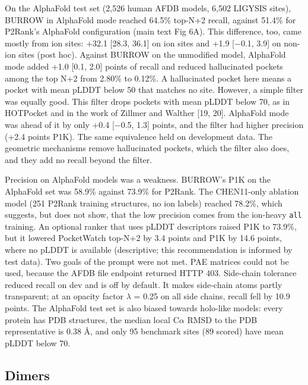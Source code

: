 \documentclass[10pt,letterpaper]{article}
\begin{document}
On the AlphaFold test set (2,526 human AFDB models, 6,502 LIGYSIS sites), BURROW in AlphaFold mode reached 64.5\% top-N+2 recall, against 51.4\% for P2Rank's AlphaFold configuration (main text Fig 6A). This difference, too, came mostly from ion sites: +32.1 [28.3, 36.1] on ion sites and +1.9 [$-$0.1, 3.9] on non-ion sites (post hoc). Against BURROW on the unmodified model, AlphaFold mode added +1.0 [0.1, 2.0] points of recall and reduced hallucinated pockets among the top N+2 from 2.80\% to 0.12\%. A hallucinated pocket here means a pocket with mean pLDDT below 50 that matches no site. However, a simple filter was equally good. This filter drops pockets with mean pLDDT below 70, as in HOTPocket and in the work of Zillmer and Walther [19, 20]. AlphaFold mode was ahead of it by only +0.4 [$-$0.5, 1.3] points, and the filter had higher precision (+2.4 points P1K). The same equivalence held on development data. The geometric mechanisms remove hallucinated pockets, which the filter also does, and they add no recall beyond the filter.

Precision on AlphaFold models was a weakness. BURROW's P1K on the AlphaFold set was 58.9\% against 73.9\% for P2Rank. The CHEN11-only ablation model (251 P2Rank training structures, no ion labels) reached 78.2\%, which suggests, but does not show, that the low precision comes from the ion-heavy \texttt{all} training. An optional ranker that uses pLDDT descriptors raised P1K to 73.9\%, but it lowered PocketWatch top-N+2 by 3.4 points and P1K by 14.6 points, where no pLDDT is available (descriptive; this recommendation is informed by test data). Two goals of the prompt were not met. PAE matrices could not be used, because the AFDB file endpoint returned HTTP 403. Side-chain tolerance reduced recall on dev and is off by default. It makes side-chain atoms partly transparent; at an opacity factor $\lambda$ = 0.25 on all side chains, recall fell by 10.9 points. The AlphaFold test set is also biased towards holo-like models: every protein has PDB structures, the median local C$\alpha$ RMSD to the PDB representative is 0.38 \AA{}, and only 95 benchmark sites (89 scored) have mean pLDDT below 70.

\subsection*{Dimers}
\end{document}
